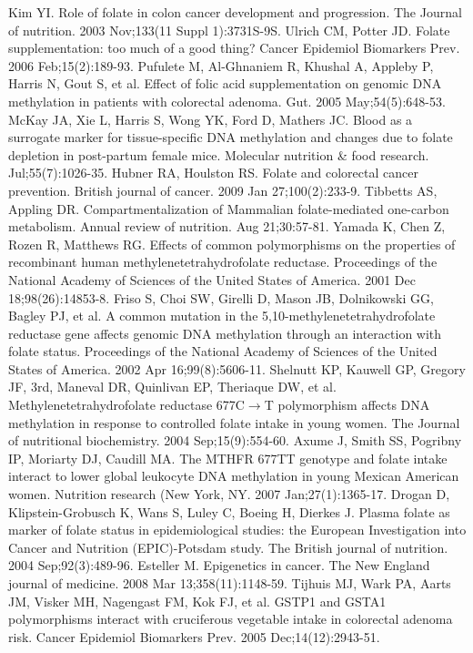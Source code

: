 \begin{thebibliography}{12}
		Kim YI. Role of folate in colon cancer development and progression. The Journal of nutrition. 2003 Nov;133(11 Suppl 1):3731S-9S. 
		Ulrich CM, Potter JD. Folate supplementation: too much of a good thing? Cancer Epidemiol Biomarkers Prev. 2006 Feb;15(2):189-93. 
		Pufulete M, Al-Ghnaniem R, Khushal A, Appleby P, Harris N, Gout S, et al. Effect of folic acid supplementation on genomic DNA methylation in patients with colorectal adenoma. Gut. 2005 May;54(5):648-53. 
		McKay JA, Xie L, Harris S, Wong YK, Ford D, Mathers JC. Blood as a surrogate marker for tissue-specific DNA methylation and changes due to folate depletion in post-partum female mice. Molecular nutrition \& food research.  Jul;55(7):1026-35. 
		Hubner RA, Houlston RS. Folate and colorectal cancer prevention. British journal of cancer. 2009 Jan 27;100(2):233-9. 
		Tibbetts AS, Appling DR. Compartmentalization of Mammalian folate-mediated one-carbon metabolism. Annual review of nutrition.  Aug 21;30:57-81. 
		Yamada K, Chen Z, Rozen R, Matthews RG. Effects of common polymorphisms on the properties of recombinant human methylenetetrahydrofolate reductase. Proceedings of the National Academy of Sciences of the United States of America. 2001 Dec 18;98(26):14853-8. 
		Friso S, Choi SW, Girelli D, Mason JB, Dolnikowski GG, Bagley PJ, et al. A common mutation in the 5,10-methylenetetrahydrofolate reductase gene affects genomic DNA methylation through an interaction with folate status. Proceedings of the National Academy of Sciences of the United States of America. 2002 Apr 16;99(8):5606-11. 
		Shelnutt KP, Kauwell GP, Gregory JF, 3rd, Maneval DR, Quinlivan EP, Theriaque DW, et al. Methylenetetrahydrofolate reductase 677C$\rightarrow$T polymorphism affects DNA methylation in response to controlled folate intake in young women. The Journal of nutritional biochemistry. 2004 Sep;15(9):554-60. 
		Axume J, Smith SS, Pogribny IP, Moriarty DJ, Caudill MA. The MTHFR 677TT genotype and folate intake interact to lower global leukocyte DNA methylation in young Mexican American women. Nutrition research (New York, NY. 2007 Jan;27(1):1365-17. 
		Drogan D, Klipstein-Grobusch K, Wans S, Luley C, Boeing H, Dierkes J. Plasma folate as marker of folate status in epidemiological studies: the European Investigation into Cancer and Nutrition (EPIC)-Potsdam study. The British journal of nutrition. 2004 Sep;92(3):489-96. 
		Esteller M. Epigenetics in cancer. The New England journal of medicine. 2008 Mar 13;358(11):1148-59. 
		Tijhuis MJ, Wark PA, Aarts JM, Visker MH, Nagengast FM, Kok FJ, et al. GSTP1 and GSTA1 polymorphisms interact with cruciferous vegetable intake in colorectal adenoma risk. Cancer Epidemiol Biomarkers Prev. 2005 Dec;14(12):2943-51. 
\end{thebibliography} 
